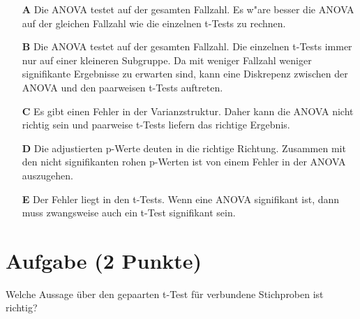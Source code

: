 \documentclass[a4paper, 10pt]{scrartcl}\usepackage[]{graphicx}\usepackage[]{xcolor}
\begin{document}
\begin{enumerate}
\item [\textbf{A} \msquare] Die ANOVA testet auf der gesamten Fallzahl. Es w{"a}re besser die ANOVA auf der gleichen Fallzahl wie die einzelnen t-Tests zu rechnen.
\item [\textbf{B} \msquare] Die ANOVA testet auf der gesamten Fallzahl. Die einzelnen t-Tests immer nur auf einer kleineren Subgruppe. Da mit weniger Fallzahl weniger signifikante Ergebnisse zu erwarten sind, kann eine Diskrepenz zwischen der ANOVA und den paarweisen t-Tests auftreten.
\item [\textbf{C} \msquare] Es gibt einen Fehler in der Varianzstruktur. Daher kann die ANOVA nicht richtig sein und paarweise t-Tests liefern das richtige Ergebnis.
\item [\textbf{D} \msquare] Die adjustierten p-Werte deuten in die richtige Richtung. Zusammen mit den nicht signifikanten rohen p-Werten ist von einem Fehler in der ANOVA auszugehen.
\item [\textbf{E} \msquare] Der Fehler liegt in den t-Tests. Wenn eine ANOVA signifikant ist, dann muss zwangsweise auch ein t-Test signifikant sein.
\end{enumerate} 

\section{Aufgabe \hfill (2 Punkte)}

Welche Aussage {\"u}ber den gepaarten t-Test f{\"u}r verbundene Stichproben ist richtig?
\end{document}
